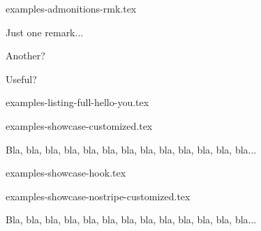 \begin{filecontents*}[overwrite]{examples-admonitions-rmk.tex}
\begin{tdocrem}
    Just one remark...
\end{tdocrem}

\begin{tdocrem}
    Another?
\end{tdocrem}

\begin{tdocrem}
    Useful?
\end{tdocrem}
\end{filecontents*}


\begin{filecontents*}[overwrite]{examples-listing-full-hello-you.tex}
\newcommand{\helloyou}[1]{%
    \IfBlankTF{#1}{%
        Ah, pas très bavard aujourd'hui !%
    }{%
        Bonjour #1.

        Épatant ! En fait, pas du tout...%
    }
}
\end{filecontents*}


\begin{filecontents*}[overwrite]{examples-showcase-customized.tex}
\begin{tdocshowcase}[before     = My beginning,
                     after      = My end,
                     col-stripe = red,
                     col-text   = orange!75!black]
    Bla, bla, bla, bla, bla, bla, bla, bla, bla, bla, bla, bla, bla...
\end{tdocshowcase}
\end{filecontents*}


\begin{filecontents*}[overwrite]{examples-showcase-hook.tex}
\begin{tdocshowcase}
\end{tdocshowcase}
\end{filecontents*}


\begin{filecontents*}[overwrite]{examples-showcase-nostripe-customized.tex}
\begin{tdocshowcase}[nostripe,
                     before     = My beginning,
                     after      = My end,
                     col-stripe = green,
                     col-text   = purple]
    Bla, bla, bla, bla, bla, bla, bla, bla, bla, bla, bla, bla, bla...
\end{tdocshowcase}
\end{filecontents*}


